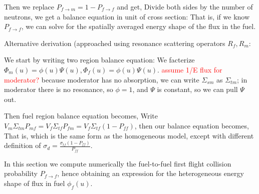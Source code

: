\documentclass{school-22.211-notes}
\begin{document}
\begin{enumerate}
Then we replace $P_{f\to m} = 1 - P_{f\to f}$ and get, 
Divide both sides by the number of neutrons, we get a balance equation in unit of cross section:
That is, if we know $P_{f\to f}$, we can solve for the spatially averaged energy shape of the flux in the fuel. 
\end{enumerate}


Alternative derivation (approached using resonance scattering operators $R_f, R_m$: 

We start by writing two region balance equation: 
We facterize $\Phi_m(u) = \phi(u) \Psi(u), \Phi_f (u) = \phi(u) \Psi(u)$. \textcolor{red}{assume 1/E flux for moderator?}
because moderator has no absorption, we can write $\Sigma_{sm}$ as $\Sigma_{tm}$; in moderator there is no resonance, so $\phi = 1$, and $\Psi$ is constant, so we can pull $\Psi$ out. 

Then fuel region balance equation becomes,
Write $V_m \Sigma_{tm} P_{mf} = V_f \Sigma_{tf} P_{fm} = V_f \Sigma_{tf} (1- P_{ff})$, then our balance equation becomes, 
That is, 
which is the same form as the homogeneous model, except with  different definition of $\sigma_d = \frac{\sigma_{tf} (1 - P_{ff})}{P_{ff}}$. 



\clearpage
{}
In this section we compute numerically the fuel-to-fuel first flight collision probability $P_{f\to f}$, hence obtaining an expression for the heterogeneous energy shape of flux in fuel $\phi_f(u)$. 
\end{document}
